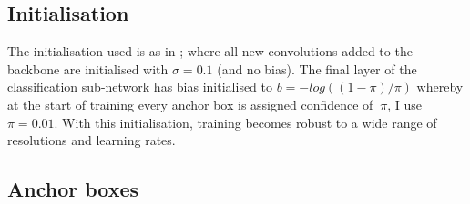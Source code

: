 \subsection{Initialisation}

The initialisation used is as in \cite{Lin2017}; where all new convolutions added to the backbone are initialised with $\sigma=0.1$ (and no bias). The final layer of the classification sub-network has bias initialised to $b = −log((1 − \pi)/\pi) $ whereby at the start of training every anchor box is assigned confidence of $~\pi$, I use $\pi=0.01$. With this initialisation, training becomes robust to a wide range of resolutions and learning rates.

\subsection{Anchor boxes}

